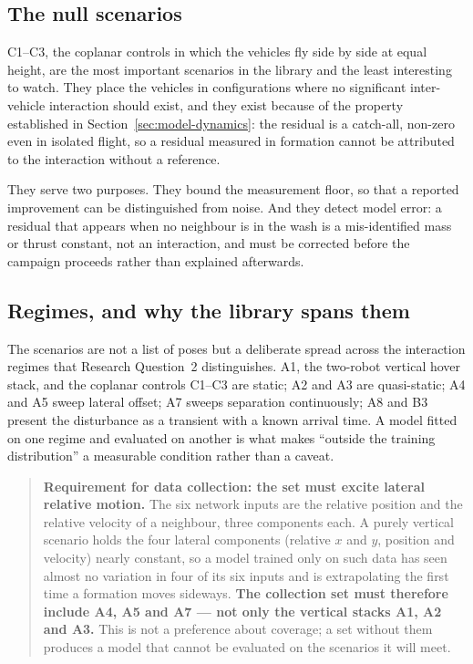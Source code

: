 \subsection{The null scenarios}
\label{sec:setup-null}

C1--C3, the coplanar controls in which the vehicles fly side by side at equal height, are the most
important scenarios in the library and the least interesting to watch. They
place the vehicles in configurations where no significant inter-vehicle interaction should exist,
and they exist because of the property established in Section~\ref{sec:model-dynamics}: the
residual is a catch-all, non-zero even in isolated flight, so a residual measured in formation
cannot be attributed to the interaction without a reference.

They serve two purposes. They bound the measurement floor, so that a reported improvement can be
distinguished from noise. And they detect model error: a residual that appears when no neighbour is
in the wash is a mis-identified mass or thrust constant, not an interaction, and must be corrected
before the campaign proceeds rather than explained afterwards.

\subsection{Regimes, and why the library spans them}

The scenarios are not a list of poses but a deliberate spread across the interaction regimes that
Research Question~2 distinguishes. A1, the two-robot vertical hover stack, and the coplanar
controls C1--C3 are static; A2 and A3 are quasi-static; A4 and A5
sweep lateral offset; A7 sweeps separation continuously; A8 and B3 present the disturbance as a
transient with a known arrival time. A model fitted on one regime and evaluated on another is what
makes ``outside the training distribution'' a measurable condition rather than a caveat.

\begin{quote}
\textbf{Requirement for data collection: the set must excite lateral relative motion.}
The six network inputs are the relative position and the relative velocity of a neighbour, three
components each. A purely vertical scenario holds the four lateral components (relative $x$ and $y$,
position and velocity) nearly constant, so a model trained only on such data has seen almost no
variation in four of its six inputs and is extrapolating the first time a formation moves sideways. \textbf{The collection set must therefore include A4, A5
and A7 --- not only the vertical stacks A1, A2 and A3.} This is not a preference about coverage; a
set without them produces a model that cannot be evaluated on the scenarios it will meet.
\end{quote}

